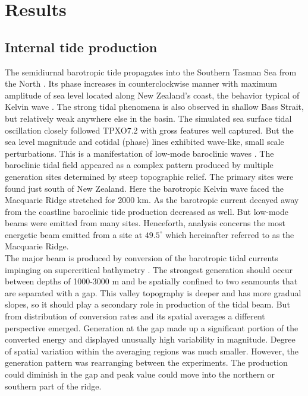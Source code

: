 \documentclass[12pt]{article}
\begin{document}
\section{Results}
\subsection{Internal tide production}
\label{C3.sec:main_res}
The semidiurnal barotropic tide propagates into the Southern Tasman Sea from the North 
. Its phase increases in counterclockwise manner with maximum amplitude of sea 
level located along New Zealand's coast, the behavior typical of Kelvin wave 
\citep{walters2001ocean}. 
The strong tidal phenomena is also observed in shallow Bass Strait, but relatively weak anywhere 
else in the basin. The simulated sea surface tidal oscillation closely followed TPXO7.2 with gross 
features well captured. But the sea level magnitude and cotidal (phase) lines exhibited wave-like, 
small scale perturbations. This is a manifestation of low-mode baroclinic waves 
. The baroclinic tidal field appeared as a complex pattern produced by 
multiple generation sites determined by steep topographic relief. The primary sites were found just 
south 
of 
New Zealand. Here the barotropic Kelvin wave faced the Macquarie Ridge stretched for 2000 km. As 
the barotropic current decayed away from the coastline baroclinic tide production decreased as 
well. 
But low-mode beams were emitted from many sites. Henceforth, analysis concerns the 
most energetic beam emitted from a site at $49.5^{\circ}$ which hereinafter referred to as the 
Macquarie Ridge.\\

The major beam is produced by conversion of the barotropic tidal currents impinging on 
supercritical bathymetry . The strongest generation should occur between depths 
of 1000-3000 m and be spatially confined to two seamounts that are separated with a gap. This 
valley 
topography is deeper and has more gradual slopes, so it should play a secondary role in production 
of the tidal beam. But from distribution of conversion rates  and its 
spatial averages  a different perspective emerged. Generation at the gap 
made up a significant portion of the converted energy and displayed unusually high variability in 
magnitude. Degree of spatial variation within the averaging regions was much smaller. However,  
the generation pattern was rearranging between the experiments. The production could diminish in 
the gap and peak value could move into the northern or southern part of the ridge.\\
\end{document}
